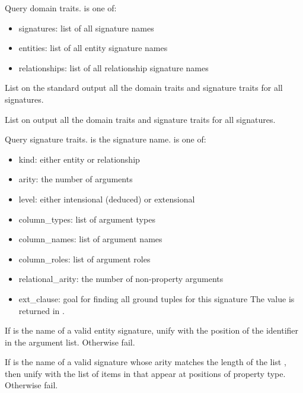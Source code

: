 \begin{description}
Query domain traits.  is one of:

\begin{itemize}
    \item signatures: list of all signature names
    \item entities: list of all entity signature names
    \item relationships: list of all relationship signature names
\end{itemize}

List on the standard output all the domain traits and signature
traits for all signatures.

List on output  all the domain traits and signature
traits for all signatures.

Query signature traits.  is the signature name.  is one of:

\begin{itemize}
    \item kind: either entity or relationship
    \item arity: the number of arguments
    \item level: either intensional (deduced) or extensional
    \item column_types: list of argument types
    \item column_names: list of argument names
    \item column_roles: list of argument roles
    \item relational_arity: the number of non-property arguments
    \item ext_clause: goal for finding all ground tuples for this signature
The value is returned in .
\end{itemize}

If  is the name of a valid entity signature, unify  with
the position of the identifier in the argument list. Otherwise fail.

If  is the name of a valid signature whose arity matches the
length of the list , then unify  with the list of
items in  that appear at positions of property type. Otherwise
fail.


\end{description}
